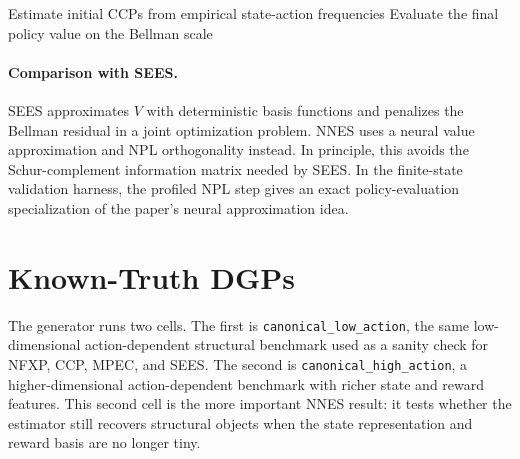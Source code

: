 \documentclass[10pt]{article}
\begin{document}
\begin{algorithm}[H]
\DontPrintSemicolon
\caption{NNES with NPL value regression}
Estimate initial CCPs from empirical state-action frequencies\;
Evaluate the final policy value on the Bellman scale\;
\end{algorithm}

\paragraph{Comparison with SEES.}
SEES \citep{luoSang2024} approximates \(V\) with deterministic basis functions
and penalizes the Bellman residual in a joint optimization problem. NNES uses a
neural value approximation and NPL orthogonality instead. In principle, this
avoids the Schur-complement information matrix needed by SEES. In the
finite-state validation harness, the profiled NPL step gives an exact
policy-evaluation specialization of the paper's neural approximation idea.

\section{Known-Truth DGPs}

The generator runs two cells. The first is \texttt{canonical\_low\_action}, the
same low-dimensional action-dependent structural benchmark used as a sanity
check for NFXP, CCP, MPEC, and SEES. The second is
\texttt{canonical\_high\_action}, a higher-dimensional action-dependent
benchmark with richer state and reward features. This second cell is the more
important NNES result: it tests whether the estimator still recovers structural
objects when the state representation and reward basis are no longer tiny.
\end{document}
